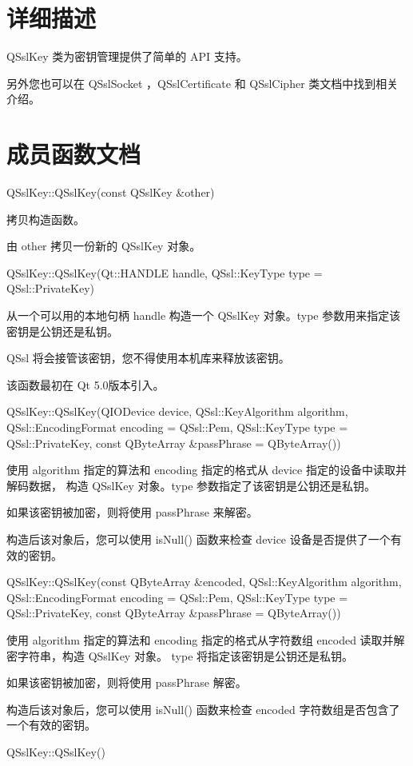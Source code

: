 \section{详细描述}

QSslKey 类为密钥管理提供了简单的 API 支持。

另外您也可以在 QSslSocket ，QSslCertificate 和 QSslCipher 类文档中找到相关介绍。

\section{成员函数文档}

QSslKey::QSslKey(const QSslKey \&other)

拷贝构造函数。

由 other 拷贝一份新的 QSslKey 对象。

QSslKey::QSslKey(Qt::HANDLE handle, QSsl::KeyType type = QSsl::PrivateKey)

从一个可以用的本地句柄 handle 构造一个 QSslKey 对象。type 参数用来指定该密钥是公钥还是私钥。

QSsl 将会接管该密钥，您不得使用本机库来释放该密钥。

该函数最初在 Qt 5.0版本引入。

QSslKey::QSslKey(QIODevice \*device, 
    QSsl::KeyAlgorithm algorithm, 
	QSsl::EncodingFormat encoding = QSsl::Pem,
	QSsl::KeyType type = QSsl::PrivateKey, 
	const QByteArray \&passPhrase = QByteArray())

使用 algorithm 指定的算法和 encoding 指定的格式从 device 指定的设备中读取并解码数据，
构造 QSslKey 对象。type 参数指定了该密钥是公钥还是私钥。

如果该密钥被加密，则将使用 passPhrase 来解密。

构造后该对象后，您可以使用 isNull() 函数来检查 device 设备是否提供了一个有效的密钥。

QSslKey::QSslKey(const QByteArray \&encoded, 
	QSsl::KeyAlgorithm algorithm, 
	QSsl::EncodingFormat encoding = QSsl::Pem, 
	QSsl::KeyType type = QSsl::PrivateKey, 
	const QByteArray \&passPhrase = QByteArray())

使用 algorithm 指定的算法和 encoding 指定的格式从字符数组 encoded 读取并解密字符串，构造 QSslKey 对象。 type 将指定该密钥是公钥还是私钥。

如果该密钥被加密，则将使用 passPhrase 解密。

构造后该对象后，您可以使用 isNull() 函数来检查 encoded 字符数组是否包含了一个有效的密钥。

QSslKey::QSslKey()

